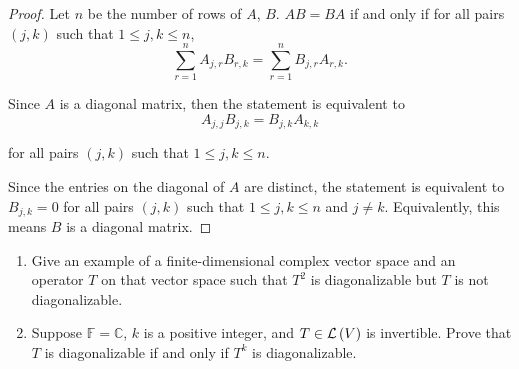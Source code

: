 \begin{proof}
    Let $n$ be the number of rows of $A$, $B$. $AB = BA$ if and only if for all pairs $(j, k)$ such that $1\leq j, k\leq n$,
    \[
        \sum^{n}_{r=1}A_{j,r}B_{r,k} = \sum^{n}_{r=1}B_{j,r}A_{r,k}.
    \]

    Since $A$ is a diagonal matrix, then the statement is equivalent to
    \[
        A_{j,j}B_{j,k} = B_{j,k}A_{k,k}
    \]

    for all pairs $(j, k)$ such that $1\leq j, k\leq n$.

    Since the entries on the diagonal of $A$ are distinct, the statement is equivalent to $B_{j,k} = 0$ for all pairs $(j, k)$ such that $1\leq j, k\leq n$ and $j\ne k$. Equivalently, this means $B$ is a diagonal matrix.
\end{proof}
\newpage

\begin{exercise}
    \begin{enumerate}[label={(\alph*)}]
        \item Give an example of a finite-dimensional complex vector space and an
              operator $T$ on that vector space such that $T^{2}$ is diagonalizable but $T$ is not diagonalizable.
        \item Suppose $\mathbb{F} = \mathbb{C}$, $k$ is a positive integer, and $T\in\mathcal{L}\left({V}\right)$ is invertible. Prove that $T$ is diagonalizable if and only if $T^{k}$ is diagonalizable.
    \end{enumerate}
\end{exercise}

